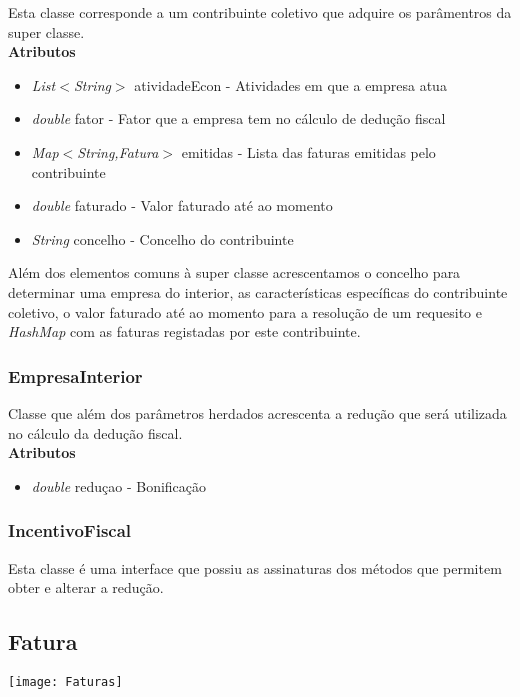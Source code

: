 \documentclass[10pt,a4paper]{article}
\begin{document}
Esta classe corresponde a um contribuinte coletivo que adquire os parâmentros da super classe.\\

{\bf{Atributos}}
\begin{itemize}
 \item \textit{List$<$String$>$} atividadeEcon - Atividades em que a empresa atua
 \item \textit{double} fator - Fator que a empresa tem no cálculo de dedução fiscal
 \item \textit{Map$<$String,Fatura$>$} emitidas - Lista das faturas emitidas pelo contribuinte
 \item \textit{double} faturado - Valor faturado até ao momento
 \item \textit{String} concelho - Concelho do contribuinte
\end{itemize}

Além dos elementos comuns à super classe acrescentamos o concelho para determinar uma empresa do interior, as características específicas do contribuinte coletivo, o valor faturado até ao momento para a resolução de um requesito e \textit{HashMap} com as faturas registadas por este contribuinte.

\subsubsection{EmpresaInterior}
Classe que além dos parâmetros herdados acrescenta a redução que será utilizada no cálculo da dedução fiscal.\\

{\bf{Atributos}}
\begin{itemize}
 \item \textit{double} reduçao - Bonificação
\end{itemize}

\subsubsection{IncentivoFiscal}
Esta classe é uma interface que possiu as assinaturas dos métodos que permitem obter e alterar a redução.

\subsection{Fatura}


\begin{center}
\graphicspath{ {/home/jessica/Desktop/} }
\texttt{[image: Faturas]}\\
\end{center}
\end{document}
